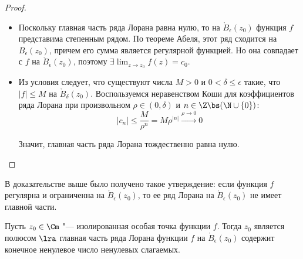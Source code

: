 \begin{proof}~
	\begin{itemize}
		\item[$\la$]Поскольку главная часть ряда Лорана равна нулю, то на $\mathring B_\epsilon(z_0)$ функция $f$ представима степенным рядом. По теореме Абеля, этот ряд сходится на $B_\epsilon(z_0)$, причем его сумма является регулярной функцией. Но она совпадает с $f$ на $\mathring B_\epsilon(z_0)$, поэтому $\exists \lim_{z \to z_0}f(z) = c_0$.
		
		\item[$\ra$]Из условия следует, что существуют числа $M > 0$ и $0 < \delta \le \epsilon$ такие, что $|f| \le M$ на $\mathring B_\delta(z_0)$. Воспользуемся неравенством Коши для коэффициентов ряда Лорана при произвольном $\rho \in (0, \delta)$ и $n \in \Z \bs (\N \cup \{0\})$:
		\[|c_n| \le \frac{M}{\rho^n} = M\rho^{|n|} \xrightarrow{\rho \to 0} 0\]
		
		Значит, главная часть ряда Лорана тождественно равна нулю.\qedhere
	\end{itemize}
\end{proof}

\begin{note}
	В доказательстве выше было получено такое утверждение: если функция $f$ регулярна и ограниченна на $\mathring B_\epsilon(z_0)$, то ее ряд Лорана на $\mathring B_\epsilon(z_0)$ не имеет главной части.
\end{note}

\begin{proposition}
	Пусть $z_0 \in \Cm$ "--- изолированная особая точка функции $f$. Тогда $z_0$ является полюсом $\lra$ главная часть ряда Лорана функции $f$ на $\mathring B_\epsilon(z_0)$ содержит конечное ненулевое число ненулевых слагаемых.
\end{proposition}

